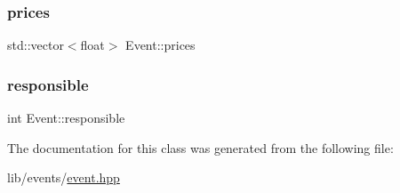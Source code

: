 \subsubsection{\texorpdfstring{prices}{prices}}
{\footnotesize\ttfamily std\+::vector$<$float$>$ Event\+::prices\hspace{0.3cm}{\ttfamily [protected]}}

\mbox{\label{class_event_aab3e742a3f882731bd73996f4c66eef1}} 
\subsubsection{\texorpdfstring{responsible}{responsible}}
{\footnotesize\ttfamily int Event\+::responsible\hspace{0.3cm}{\ttfamily [protected]}}



The documentation for this class was generated from the following file\+:\begin{DoxyCompactItemize}
\item 
lib/events/\hyperlink{event_8hpp}{event.\+hpp}\end{DoxyCompactItemize}
